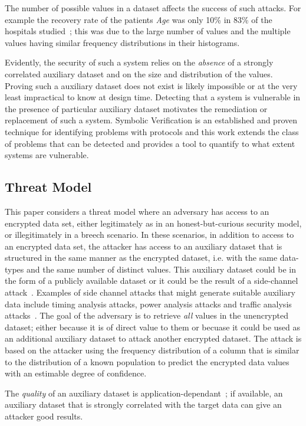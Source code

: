 \documentclass[runningheads]{llncs}
\begin{document}
The number of possible values in a dataset affects the success of such attacks. For example the recovery rate of the patients \textit{Age} was only 10\% in 83\% of the hospitals studied~\cite{InfrenceAttacks}; this was due to the large number of values and the multiple values having similar frequency distributions in their histograms.

Evidently, the security of such a system relies on the \textit{absence} of a strongly correlated auxiliary dataset and on the size and distribution of the values. 
Proving such a auxiliary dataset does not exist is likely impossible or at the very least impractical to know at design time.  Detecting that a system is vulnerable in the presence of particular auxiliary dataset motivates the remediation or replacement of such a system.
Symbolic Verification is an established and proven technique for identifying problems with protocols and this work extends the class of problems that can be detected and provides a tool to quantify to what extent systems are vulnerable.


\subsection{Threat Model}
This paper considers a threat model where an adversary has access to an encrypted data set, either legitimately as in an honest-but-curious security model, or illegitimately in a breech scenario. 
In these scenarios, in addition to access to an encrypted data set, the attacker has access to an auxiliary dataset that is structured in the same manner as the encrypted dataset, i.e. with the same data-types and the same number of distinct values. This auxiliary dataset could be in the form of a publicly available dataset or it could be the result of a side-channel attack~\cite{Kocher96}. Examples of side channel attacks that might generate suitable auxiliary data include timing analysis attacks, power analysis attacks and traffic analysis attacks~\cite{SideChannelSurvey}.
The goal of the adversary is to retrieve \textit{all} values in the unencrypted dataset; either because it is of direct value to them or becuase it could be used as an additional auxiliary dataset to attack another encrypted dataset. 
The attack is based on the attacker using the frequency distribution of a column that is similar to the distribution of a known population to predict the encrypted data values with an estimable degree of confidence.

The \textit{quality} of an auxiliary dataset is application-dependant~\cite{InfrenceAttacks}; if available, an auxiliary dataset that is strongly correlated with the target data can give an attacker good results.
\end{document}
